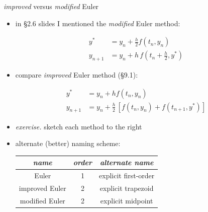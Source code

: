 \documentclass[urlcolor=blue,dvipsnames]{beamer}
\begin{document}
\begin{frame}{\emph{improved} versus \emph{modified} Euler}

\small
\begin{itemize}
\item in \S2.6 slides I mentioned the \emph{modified} Euler method:

\vspace{-3mm}
\begin{minipage}{0.5\textwidth}
\begin{align*}
    y^\ast  &= y_n + \frac{h}{2} f(t_n,y_n) \\
    y_{n+1} &= y_n + h\, f(t_n+\frac{h}{2},y^\ast)
\end{align*}
\end{minipage}
\hspace{50mm}
\item compare \emph{improved} Euler method (\S9.1):

\vspace{-3mm}
\begin{minipage}{0.5\textwidth}
\begin{align*}
    y^\ast  &= y_n + h f(t_n,y_n) \\
    y_{n+1} &= y_n + \frac{h}{2}\, \left[f(t_n,y_n)+f(t_{n+1},y^\ast)\right]
\end{align*}
\end{minipage}
\hspace{50mm}
\item \alert{\emph{exercise.} sketch each method to the right}
\item alternate (better) naming scheme:

\begin{center}
\begin{tabular}{c|c|c}
\emph{name} & \emph{order} & \emph{alternate name} \\ \hline
Euler & 1 & explicit first-order \\
improved Euler & 2 & explicit trapezoid \\
modified Euler & 2 & explicit midpoint
\end{tabular}
\end{center}
\end{itemize}
\end{frame}
\end{document}
